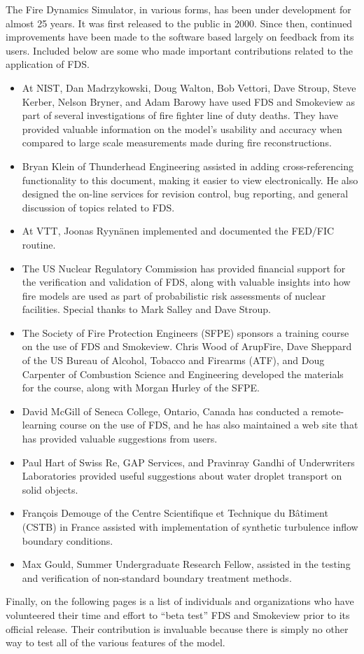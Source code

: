 \documentclass[11pt]{book}
\begin{document}
The Fire Dynamics Simulator, in various forms, has been under development for almost 25 years. It was first released to the public in 2000. Since then, continued improvements have been made to the software based largely on feedback from its users. Included below are some who made important contributions related to the application of FDS.
\begin{itemize}
\item At NIST, Dan Madrzykowski, Doug Walton, Bob Vettori, Dave Stroup, Steve Kerber, Nelson Bryner, and Adam Barowy have used FDS and Smokeview as part of several investigations of fire fighter line of duty deaths. They have provided valuable information on the model's usability and accuracy when compared to large scale measurements made during fire reconstructions.
\item Bryan Klein of Thunderhead Engineering assisted in adding cross-referencing functionality to this document, making it easier to view electronically. He also designed the on-line services for revision control, bug reporting, and general discussion of topics related to FDS.
\item At VTT, Joonas Ryyn\"{a}nen implemented and documented the FED/FIC routine.
\item The US Nuclear Regulatory Commission has provided financial support for the verification and validation of FDS, along with valuable insights into how fire models are used as part of probabilistic risk assessments of nuclear facilities. Special thanks to Mark Salley and Dave Stroup.
\item The Society of Fire Protection Engineers (SFPE) sponsors a training course on the use of FDS and Smokeview. Chris Wood of ArupFire, Dave Sheppard of the US Bureau of Alcohol, Tobacco and Firearms (ATF), and Doug Carpenter of Combustion Science and Engineering developed the materials for the course, along with Morgan Hurley of the SFPE.
\item David McGill of Seneca College, Ontario, Canada has conducted a remote-learning course on the use of FDS, and he has also maintained a web site that has provided valuable suggestions from users.
\item Paul Hart of Swiss Re, GAP Services, and Pravinray Gandhi of Underwriters Laboratories provided useful suggestions about water droplet transport on solid objects.
\item Fran\c{c}ois Demouge of the Centre Scientifique et Technique du B\^{a}timent (CSTB) in France assisted with implementation of synthetic turbulence inflow boundary conditions.
\item Max Gould, Summer Undergraduate Research Fellow, assisted in the testing and verification of non-standard boundary treatment methods.
\end{itemize}
Finally, on the following pages is a list of individuals and organizations who have volunteered their time and effort to
``beta test'' FDS and Smokeview prior to its official release. Their contribution is invaluable because there is simply no other way
to test all of the various features of the model.
\end{document}
